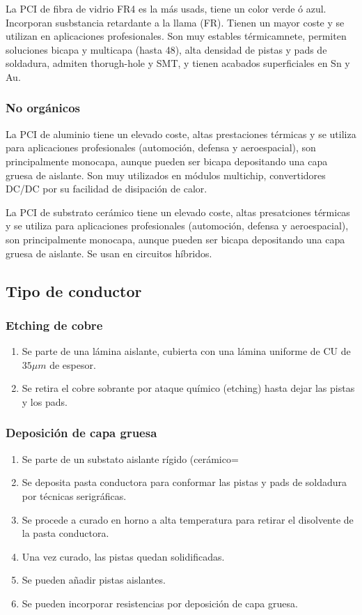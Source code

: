 La PCI de fibra de vidrio FR4 es la más usads, tiene un color verde ó azul. Incorporan susbstancia retardante a la llama (FR). Tienen un mayor coste y se utilizan en aplicaciones profesionales. Son muy estables térmicamnete, permiten soluciones bicapa y multicapa (hasta 48), alta densidad de pistas y pads de soldadura, admiten thorugh-hole y SMT, y tienen acabados superficiales en Sn y Au.

\subsubsection{No orgánicos}

La PCI de aluminio tiene un elevado coste, altas prestaciones térmicas y se utiliza para aplicaciones profesionales (automoción, defensa y aeroespacial), son principalmente monocapa, aunque pueden ser bicapa depositando una capa gruesa de aislante. Son muy utilizados en módulos multichip, convertidores DC/DC por su facilidad de disipación de calor.

La PCI de substrato cerámico tiene un elevado coste, altas presatciones térmicas y se utiliza para aplicaciones profesionales (automoción, defensa y aeroespacial), son principalmente monocapa, aunque pueden ser bicapa depositando una capa gruesa de aislante. Se usan en circuitos híbridos.

\subsection{Tipo de conductor}
\subsubsection{Etching de cobre}
\begin{enumerate}
    \item Se parte de una lámina aislante, cubierta con una lámina uniforme de CU de $35 \mu m$ de espesor.
    \item Se retira el cobre sobrante por ataque químico (etching) hasta dejar las pistas y los pads.
\end{enumerate}
 
\subsubsection{Deposición de capa gruesa}
\begin{enumerate}
    \item Se parte de un substato aislante rígido (cerámico=
    \item Se deposita pasta conductora para conformar las pistas y pads de soldadura por técnicas serigráficas.
    \item Se procede a curado en horno a alta temperatura para retirar el disolvente de la pasta conductora.
    \item Una vez curado, las pistas quedan solidificadas.
    \item Se pueden añadir pistas aislantes.
    \item Se pueden incorporar resistencias por deposición de capa gruesa.
\end{enumerate}

